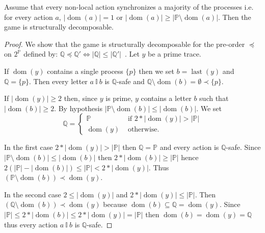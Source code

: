 \documentclass[a4paper,UKenglish]{lipics-v2016}
\newcommand{\PP}{\mathbb{P}}
\newcommand{\QQ}{\mathbb{Q}}
\newcommand{\ind}{~\mathbb{I}~}
\DeclareMathOperator{\dom}{dom}
\DeclareMathOperator{\last}{last}
\begin{document}
{Assume that every non-local action synchronizes a majority of the processes i.e. for every action $a$,
$
|\dom(a)| = 1 \text{ or }   | \dom(a) |  \geq | \PP \setminus \dom(a) |.
$
Then the game is  structurally decomposable.
}
\begin{proof}
We show that the game is structurally decomposable for  the pre-order $\preceq$ on $2^\PP$ defined by:
$
\QQ \preceq \QQ' \iff | \QQ | \leq | \QQ' |\enspace.
$
Let $y$ be a prime trace.

If $\dom(y)$ contains a single process $\{p\}$ then we set $b=\last(y)$ and $\QQ=\{p\}$. Then every letter $a \ind b$ is $\QQ$-safe and $\QQ \setminus \dom(b) = \emptyset \prec \{p\}$.

If $ |\dom(y)| \geq 2$
then, since $y$ is prime, $y$ contains a letter $b$
such that $|\dom(b)|\geq 2$.
By hypothesis
$ | \PP \setminus \dom(b) | \leq | \dom(b) | $.
We set
\[
\QQ=
\begin{cases}
\PP & \text{ if } 2 * |\dom(y)| > |\PP|\\
\dom(y) & \text{ otherwise.}
\end{cases}
\]

In the first case $2 * |\dom(y)| > |\PP|$ then $\QQ=\PP$ and
every action is $\QQ$-safe.
Since  $ | \PP \setminus \dom(b) | \leq | \dom(b) | $ then
$2 * |\dom(b) | \geq |\PP|$ hence
$ 2 (|\PP| - |\dom(b)|) \leq |\PP| < 2 * |\dom(y)|$.
Thus $(\PP \setminus \dom(b))   \prec  \dom(y)$.

In the second case $2 \leq  |\dom(y)|$ and $2 * |\dom(y)| \leq |\PP|$.
Then  $(\QQ \setminus \dom(b)) \prec \dom(y)$ because $\dom(b) \subseteq \QQ =\dom(y)$.
Since $ |\PP| \leq 2 * |\dom(b) | \leq 2 * |\dom(y)| = |\PP|$
then $\dom(b)=\dom(y)=\QQ$  thus every action $a\ind b$
is $\QQ$-safe.
\end{proof}
\end{document}

